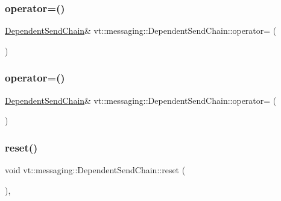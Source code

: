 \subsubsection{\texorpdfstring{operator=()}{operator=()}\hspace{0.1cm}{\footnotesize\ttfamily [1/2]}}
{\footnotesize\ttfamily \hyperlink{classvt_1_1messaging_1_1_dependent_send_chain}{Dependent\+Send\+Chain}\& vt\+::messaging\+::\+Dependent\+Send\+Chain\+::operator= (\begin{DoxyParamCaption}\item[{const \hyperlink{classvt_1_1messaging_1_1_dependent_send_chain}{Dependent\+Send\+Chain} \&}]{ }\end{DoxyParamCaption})\hspace{0.3cm}{\ttfamily [delete]}}

\mbox{\label{classvt_1_1messaging_1_1_dependent_send_chain_ad407bff30774d2a403fe26714bfe2d27}} 
\subsubsection{\texorpdfstring{operator=()}{operator=()}\hspace{0.1cm}{\footnotesize\ttfamily [2/2]}}
{\footnotesize\ttfamily \hyperlink{classvt_1_1messaging_1_1_dependent_send_chain}{Dependent\+Send\+Chain}\& vt\+::messaging\+::\+Dependent\+Send\+Chain\+::operator= (\begin{DoxyParamCaption}\item[{\hyperlink{classvt_1_1messaging_1_1_dependent_send_chain}{Dependent\+Send\+Chain} \&\&}]{ }\end{DoxyParamCaption})\hspace{0.3cm}{\ttfamily [default]}}

\mbox{\label{classvt_1_1messaging_1_1_dependent_send_chain_aa5cf0fcb78d89b1491b154c820eb9ec6}} 
\subsubsection{\texorpdfstring{reset()}{reset()}}
{\footnotesize\ttfamily void vt\+::messaging\+::\+Dependent\+Send\+Chain\+::reset (\begin{DoxyParamCaption}{ }\end{DoxyParamCaption})\hspace{0.3cm}{\ttfamily [inline]}, {\ttfamily [private]}}



